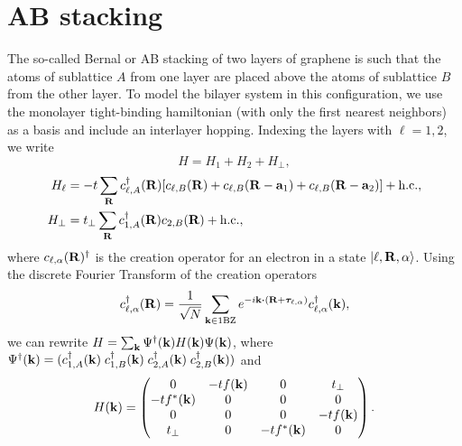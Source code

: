 \documentclass[a4paper,10pt]{article}
\begin{document}
\section{AB stacking}

The so-called Bernal or AB stacking of two layers of graphene is such that the atoms of sublattice $A$ from one layer are placed above the atoms of sublattice $B$ from the other layer.
To model the bilayer system in this configuration, we use the monolayer tight-binding hamiltonian (with only the first
nearest neighbors) as a basis and include an interlayer hopping. Indexing the layers with $\ell = 1, 2$, we write
\begin{equation} \label{eq:ab-hamil}
H = H_1 + H_2 + H_{\perp},
\end{equation}
\begin{equation} \label{eq:ab-slg-hamil}
\begin{split}
H_\ell &= -t \sum_{\vb{R}} c_{\ell,A}^\dagger(\vb{R}) [c_{\ell,B}(\vb{R}) + c_{\ell,B}(\vb{R}-\vb{a}_1) + c_{\ell,B}(\vb{R}-\vb{a}_2)] + \text{h.c.}, \\
H_\perp &= t_{\perp} \sum_{\vb{R}} c_{1,A}^\dagger(\vb{R}) c_{2,B}(\vb{R}) + \text{h.c.},
\end{split}
\end{equation}
where $c_{\ell,\alpha}(\vb{R})^\dagger$ is the creation operator for an electron in a state $\ket{\ell,\vb{R},\alpha}$. Using the discrete Fourier Transform of the creation operators
\begin{equation} \label{eq:ft-creatio}
c_{\ell,\alpha}^\d(\R) = \frac{1}{\sqrt{N}} \sum_{\k\in\text{1BZ}} e^{-i\k\vdot(\R+\bm{\tau}_{\ell,\alpha})} c_{\ell,\alpha}^\d(\k),
\end{equation}
we can rewrite $H = \sum_{\vb{k}} \Psi^\dagger(\vb{k}) H(\vb{k}) \Psi(\vb{k})$, where $\Psi^\dagger(\vb{k}) = (c_{1,A}^\dagger(\vb{k}) \; c_{1,B}^\dagger(\vb{k}) \; c_{2,A}^\dagger(\vb{k}) \; c_{2,B}^\dagger(\vb{k}))$ and
\begin{equation} \label{eq:ab-momentum_space}
H(\vb{k}) =
\begin{pmatrix}
0 & -t f(\vb{k}) & 0 & t_\perp \\
-t f^*(\vb{k}) & 0 & 0 & 0 \\
0 & 0 & 0 & -t f(\vb{k}) \\
t_\perp & 0 & -t f^*(\vb{k}) & 0 \\
\end{pmatrix}.
\end{equation}
\end{document}
